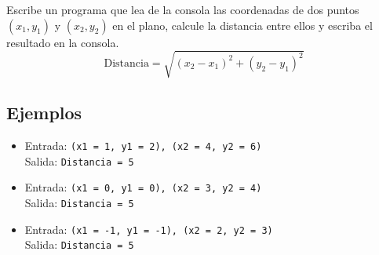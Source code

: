 Escribe un programa que lea de la consola las coordenadas de dos puntos \( (x_1, y_1) \) y \( (x_2, y_2) \) en el plano, calcule la distancia entre ellos y escriba el resultado en la consola.\\
\[
\text{Distancia} = \sqrt{(x_2 - x_1)^2 + (y_2 - y_1)^2}
\]
\subsection*{Ejemplos}
\begin{itemize}
    \item Entrada: \texttt{(x1 = 1, y1 = 2), (x2 = 4, y2 = 6)}\\
          Salida: \texttt{Distancia = 5}
    \item Entrada: \texttt{(x1 = 0, y1 = 0), (x2 = 3, y2 = 4)}\\
          Salida: \texttt{Distancia = 5}
    \item Entrada: \texttt{(x1 = -1, y1 = -1), (x2 = 2, y2 = 3)}\\
          Salida: \texttt{Distancia = 5}
\end{itemize}